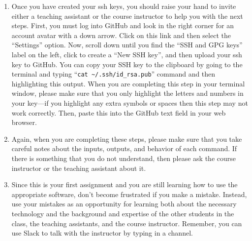 \begin{enumerate}
  \item Once you have created your ssh keys, you should raise your hand to invite either a teaching assistant or the
    course instructor to help you with the next steps. First, you must log into GitHub and look in the right corner for
    an account avatar with a down arrow. Click on this link and then select the ``Settings'' option. Now, scroll down
    until you find the ``SSH and GPG keys'' label on the left, click to create a ``New SSH key'', and then upload your
    ssh key to GitHub. You can copy your SSH key to the clipboard by going to the terminal and typing ``{\tt cat
    \textasciitilde{}/.ssh/id\_rsa.pub}'' command and then highlighting this output. When you are completing this step
    in your terminal window, please make sure that you only highlight the letters and numbers in your key---if you
    highlight any extra symbols or spaces then this step may not work correctly. Then, paste this into the GitHub text
    field in your web browser.

  \item Again, when you are completing these steps, please make sure that you take careful notes about the inputs,
    outputs, and behavior of each command. If there is something that you do not understand, then please ask the course
    instructor or the teaching assistant about it.

  \item Since this is your first  assignment and you are still learning how to use the appropriate software,
    don't become frustrated if you make a mistake. Instead, use your mistakes as an opportunity for learning both about
    the necessary technology and the background and expertise of the other students in the class, the teaching
    assistants, and the course instructor. Remember, you can use Slack to talk with the instructor by typing
     in a channel.

\end{enumerate}
 

